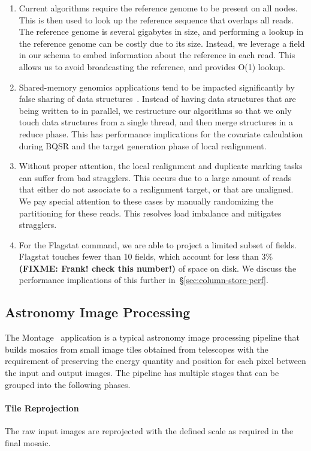 \documentclass{acm_proc_article-sp}
\begin{document}
\begin{enumerate}
\item Current algorithms require the reference genome to be present on all nodes. This is then used to
look up the reference sequence that overlaps all reads. The reference genome is several gigabytes in size,
and performing a lookup in the reference genome can be costly due to its size. Instead, we leverage a field
in our schema to embed information about the reference in each read. This allows us to avoid broadcasting
the reference, and provides O(1) lookup.
\item Shared-memory genomics applications tend to be impacted significantly by false sharing of data
structures~\cite{zaharia11}. Instead of having data structures that are being written to in parallel, we
restructure our algorithms so that we only touch data structures from a single thread, and then merge
structures in a reduce phase. This has performance implications for the covariate calculation during
BQSR and the target generation phase of local realignment.
\item Without proper attention, the local realignment and duplicate marking tasks can suffer from bad
stragglers. This occurs due to a large amount of reads that either do not associate to a realignment target,
or that are unaligned. We pay special attention to these cases by manually randomizing the partitioning
for these reads. This resolves load imbalance and mitigates stragglers.
\item For the Flagstat command, we are able to project a limited subset of fields. Flagstat touches fewer
than 10 fields, which account for less than 3\% \textbf{(FIXME: Frank! check this number!)} of space on
disk. We discuss the performance implications of this further in~\S\ref{sec:column-store-perf}.
\end{enumerate}

\subsection{Astronomy Image Processing}
\label{sec:astronomy-image-processing}
The Montage~\cite{montage} application is a typical astronomy image processing pipeline that builds mosaics from small image 
tiles obtained from telescopes with the requirement of preserving the energy quantity and position for each pixel between the 
input and output images. The pipeline has multiple stages that can be grouped into the following phases.

\paragraph{Tile Reprojection}
The raw input images are reprojected with the defined scale as required in the final mosaic. 
\end{document}

